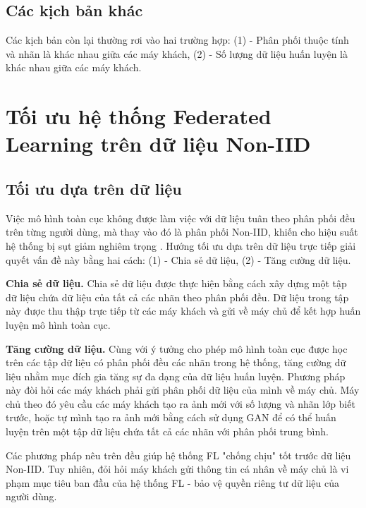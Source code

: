 \subsection{Các kịch bản khác}

Các kịch bản còn lại thường rơi vào hai trường hợp: (1) - Phân phối thuộc tính và nhãn là khác nhau giữa các máy khách, (2) - Số lượng dữ liệu huấn luyện là khác nhau giữa các máy khách.

\section{Tối ưu hệ thống Federated Learning trên dữ liệu Non-IID}

\subsection{Tối ưu dựa trên dữ liệu}

Việc mô hình toàn cục không được làm việc với dữ liệu tuân theo phân phối đều trên từng người dùng, mà thay vào đó là phân phối Non-IID, khiến cho hiệu suất hệ thống bị sụt giảm nghiêm trọng \cite{zhao2018federated}. Hướng tối ưu dựa trên dữ liệu trực tiếp giải quyết vấn đề này bằng hai cách: (1) - Chia sẻ dữ liệu, (2) - Tăng cường dữ liệu.

\textbf{Chia sẻ dữ liệu.} Chia sẻ dữ liệu \cite{zhu2021federated} được thực hiện bằng cách xây dựng một tập dữ liệu chứa dữ liệu của tất cả các nhãn theo phân phối đều. Dữ liệu trong tập này được thu thập trực tiếp từ các máy khách và gửi về máy chủ để kết hợp huấn luyện mô hình toàn cục.

\textbf{Tăng cường dữ liệu.} Cùng với ý tưởng cho phép mô hình toàn cục được học trên các tập dữ liệu có phân phối đều các nhãn trong hệ thống, tăng cường dữ liệu \cite{tanner1987calculation} nhằm mục đích gia tăng sự đa dạng của dữ liệu huấn luyện. Phương pháp này đòi hỏi các máy khách phải gửi phân phối dữ liệu của mình về máy chủ. Máy chủ theo đó yêu cầu các máy khách tạo ra ảnh mới \cite{duan2019astraea} với số lượng và nhãn lớp biết trước, hoặc tự mình tạo ra ảnh mới bằng cách sử dụng GAN \cite{zhu2021federated} để có thể huấn luyện trên một tập dữ liệu chứa tất cả các nhãn với phân phối trung bình.

Các phương pháp nêu trên đều giúp hệ thống FL "chống chịu" tốt trước dữ liệu Non-IID. Tuy nhiên, đỏi hỏi máy khách gửi thông tin cá nhân về máy chủ là vi phạm mục tiêu ban đầu của hệ thống FL - bảo vệ quyền riêng tư dữ liệu của người dùng.

